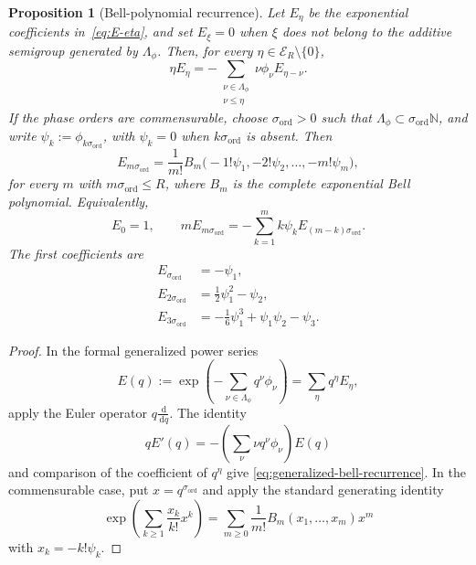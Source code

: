\documentclass[11pt]{amsart}
\numberwithin{equation}{section}
\newtheorem{proposition}[theorem]{Proposition}
\theoremstyle{definition}
\theoremstyle{remark}
\newcommand{\dd}{\,\mathrm{d}}
\newcommand{\cE}{\mathcal{E}}
\begin{document}
\begin{proposition}[Bell-polynomial recurrence]\label{prop:bell-recurrence}
Let $E_\eta$ be the exponential coefficients in~\eqref{eq:E-eta}, and set
$E_\xi=0$ when $\xi$ does not belong to the additive semigroup generated by
$\Lambda_\phi$.  Then, for every $\eta\in\cE_R\setminus\{0\}$,
\begin{equation}\label{eq:generalized-bell-recurrence}
 \eta E_\eta
 =-\sum_{\substack{\nu\in\Lambda_\phi\\\nu\le\eta}}
   \nu\phi_\nu E_{\eta-\nu}.
\end{equation}
If the phase orders are commensurable, choose $\sigma_{\mathrm{ord}}>0$
such that $\Lambda_\phi\subset\sigma_{\mathrm{ord}}\mathbb N$, and write
$\psi_k:=\phi_{k\sigma_{\mathrm{ord}}}$, with $\psi_k=0$ when
$k\sigma_{\mathrm{ord}}$ is absent.  Then
\begin{equation}\label{eq:bell-polynomial-formula}
 E_{m\sigma_{\mathrm{ord}}}
 =\frac1{m!}B_m\bigl(-1!\psi_1,-2!\psi_2,\ldots,-m!\psi_m\bigr),
\end{equation}
for every $m$ with $m\sigma_{\mathrm{ord}}\le R$, where $B_m$ is the complete exponential
Bell polynomial.  Equivalently,
\begin{equation}\label{eq:commensurable-recurrence}
 E_0=1,
 \qquad
 mE_{m\sigma_{\mathrm{ord}}}=-\sum_{k=1}^m k\psi_kE_{(m-k)\sigma_{\mathrm{ord}}}.
\end{equation}
The first coefficients are
\begin{align*}
 E_{\sigma_{\mathrm{ord}}}&=-\psi_1,\\
 E_{2\sigma_{\mathrm{ord}}}&=\frac12\psi_1^2-\psi_2,\\
 E_{3\sigma_{\mathrm{ord}}}&=-\frac16\psi_1^3+\psi_1\psi_2-\psi_3.
\end{align*}
\end{proposition}

\begin{proof}
In the formal generalized power series
\[
 E(q):=\exp\left(-\sum_{\nu\in\Lambda_\phi}q^\nu\phi_\nu\right)
      =\sum_\eta q^\eta E_\eta,
\]
apply the Euler operator $q\frac{\dd}{\dd q}$.  The identity
\[
 qE'(q)=-\left(\sum_\nu\nu q^\nu\phi_\nu\right)E(q)
\]
and comparison of the coefficient of $q^\eta$ give
\eqref{eq:generalized-bell-recurrence}.  In the commensurable case, put
$x=q^{\sigma_{\mathrm{ord}}}$ and apply the standard generating identity
\[
 \exp\left(\sum_{k\ge1}\frac{x_k}{k!}x^k\right)
 =\sum_{m\ge0}\frac1{m!}B_m(x_1,\ldots,x_m)x^m
\]
with $x_k=-k!\psi_k$.
\end{proof}
\end{document}
